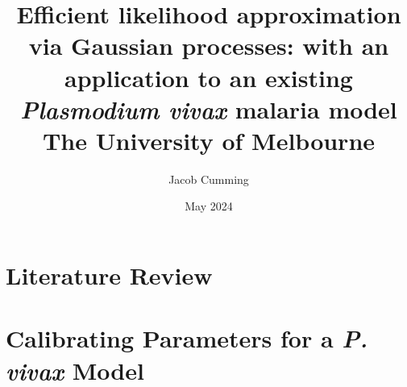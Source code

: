 \documentclass{book}
\begin{document}

\title{
{Efficient likelihood approximation via Gaussian processes: 
with an application to an existing \emph{Plasmodium vivax} malaria model}\\
{\large The University of Melbourne}
}
\author{Jacob Cumming}


\date{May 2024}

\maketitle
{}
\tableofcontents

\listoftables
\listoffigures

% 
% 


\newpage


\part{Literature Review}





\part{Calibrating Parameters for a \emph{P. vivax} Model}




\printbibliography

\appendix

\end{document}
